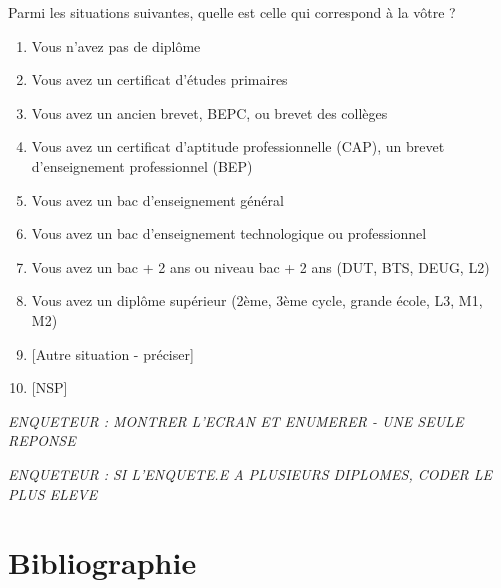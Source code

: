 \documentclass[12pt,a4paper]{reedthesis}
\providecommand{\tightlist}{%
  \setlength{\itemsep}{0pt}\setlength{\parskip}{0pt}}
\begin{document}
Parmi les situations suivantes, quelle est celle qui correspond à la vôtre ?
\begin{enumerate}
\def\labelenumi{\arabic{enumi}.}
\tightlist
\item
  Vous n'avez pas de diplôme
\item
  Vous avez un certificat d'études primaires
\item
  Vous avez un ancien brevet, BEPC, ou brevet des collèges
\item
  Vous avez un certificat d'aptitude professionnelle (CAP), un brevet d'enseignement professionnel (BEP)
\item
  Vous avez un bac d'enseignement général
\item
  Vous avez un bac d'enseignement technologique ou professionnel
\item
  Vous avez un bac + 2 ans ou niveau bac + 2 ans (DUT, BTS, DEUG, L2)
\item
  Vous avez un diplôme supérieur (2ème, 3ème cycle, grande école, L3, M1, M2)
\item
  {[}Autre situation - préciser{]}
\item
  {[}NSP{]}
\end{enumerate}
\emph{ENQUETEUR : MONTRER L'ECRAN ET ENUMERER - UNE SEULE REPONSE}

\emph{ENQUETEUR : SI L'ENQUETE.E A PLUSIEURS DIPLOMES, CODER LE PLUS ELEVE}

\backmatter

\hypertarget{bibliographie}{%
\chapter*{Bibliographie}\label{bibliographie}}


\noindent

\setlength{\parindent}{-0.20in}
\setlength{\leftskip}{0.20in}
\setlength{\parskip}{8pt}


\end{document}
